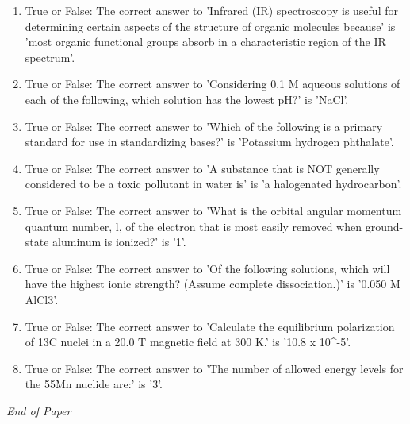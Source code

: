 \documentclass[12pt]{article}
\begin{document}
\begin{enumerate}[label=\arabic*.]
\item True or False: The correct answer to 'Infrared (IR) spectroscopy is useful for determining certain aspects of the structure of organic molecules because' is 'most organic functional groups absorb in a characteristic region of the IR spectrum'.
\item True or False: The correct answer to 'Considering 0.1 M aqueous solutions of each of the following, which solution has the lowest pH?' is 'NaCl'.
\item True or False: The correct answer to 'Which of the following is a primary standard for use in standardizing bases?' is 'Potassium hydrogen phthalate'.
\item True or False: The correct answer to 'A substance that is NOT generally considered to be a toxic pollutant in water is' is 'a halogenated hydrocarbon'.
\item True or False: The correct answer to 'What is the orbital angular momentum quantum number, l, of the electron that is most easily removed when ground-state aluminum is ionized?' is '1'.
\item True or False: The correct answer to 'Of the following solutions, which will have the highest ionic strength? (Assume complete dissociation.)' is '0.050 M AlCl3'.
\item True or False: The correct answer to 'Calculate the equilibrium polarization of 13C nuclei in a 20.0 T magnetic field at 300 K.' is '10.8 x 10\^{}-5'.
\item True or False: The correct answer to 'The number of allowed energy levels for the 55Mn nuclide are:' is '3'.
\end{enumerate}

\vfill
\noindent\textit{End of Paper}
\end{document}
